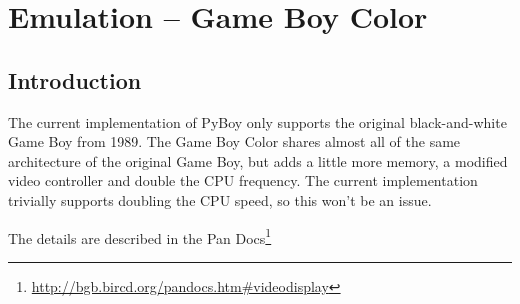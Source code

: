 \documentclass[11pt]{report} %
\begin{document}
\chapter*{Emulation -- Game Boy Color}
\section*{Introduction}
The current implementation of PyBoy only supports the original black-and-white Game Boy from 1989. The Game Boy Color shares almost all of the same architecture of the original Game Boy, but adds a little more memory, a modified video controller and double the CPU frequency. The current implementation trivially supports doubling the CPU speed, so this won't be an issue.

The details are described in the Pan Docs\footnote{\url{http://bgb.bircd.org/pandocs.htm#videodisplay}}
\end{document}
